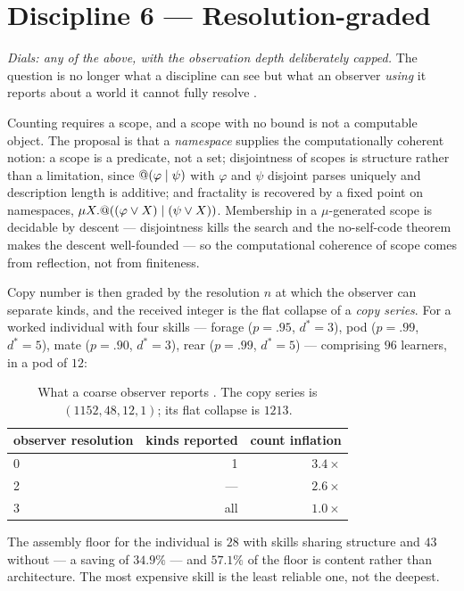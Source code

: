 \section{Discipline 6 --- Resolution-graded}
\label{sec:d6}

\emph{Dials: any of the above, with the observation depth deliberately capped.}
The question is no longer what a discipline can see but what an observer
\emph{using} it reports about a world it cannot fully resolve \cite{ScopeNote}.

Counting requires a scope, and a scope with no bound is not a computable object.
The proposal is that a \emph{namespace} supplies the computationally coherent
notion: a scope is a predicate, not a set; disjointness of scopes is structure
rather than a limitation, since $@(\varphi \mid \psi)$ with $\varphi$ and
$\psi$ disjoint parses uniquely and description length is additive; and
fractality is recovered by a fixed point on namespaces, $\mu X.@((\varphi
\vee X) \mid (\psi \vee X))$. Membership in a $\mu$-generated scope is decidable
by descent --- disjointness kills the search and the no-self-code theorem makes the
descent well-founded --- so the computational coherence of scope comes from
reflection, not from finiteness.

Copy number is then graded by the resolution $n$ at which the observer can
separate kinds, and the received integer is the flat collapse of a \emph{copy
series}. For a worked individual with four skills --- forage ($p=.95$, $d^{*}=3$),
pod ($p=.99$, $d^{*}=5$), mate ($p=.90$, $d^{*}=3$), rear ($p=.99$, $d^{*}=5$) ---
comprising $96$ learners, in a pod of $12$:

\begin{table}[h]
\centering
\small
\begin{tabular}{@{}lrr@{}}
\toprule
observer resolution & kinds reported & count inflation \\
\midrule
0 & 1 & $3.4\times$ \\
2 & --- & $2.6\times$ \\
3 & all & $1.0\times$ \\
\bottomrule
\end{tabular}
\caption{What a coarse observer reports \cite{ScopeNote}. The copy series is
$(1152, 48, 12, 1)$; its flat collapse is $1213$.}
\label{tab:observer}
\end{table}

The assembly floor for the individual is $28$ with skills sharing structure and
$43$ without --- a saving of $34.9\%$ --- and $57.1\%$ of the floor is content
rather than architecture. The most expensive skill is the least reliable one, not
the deepest.

